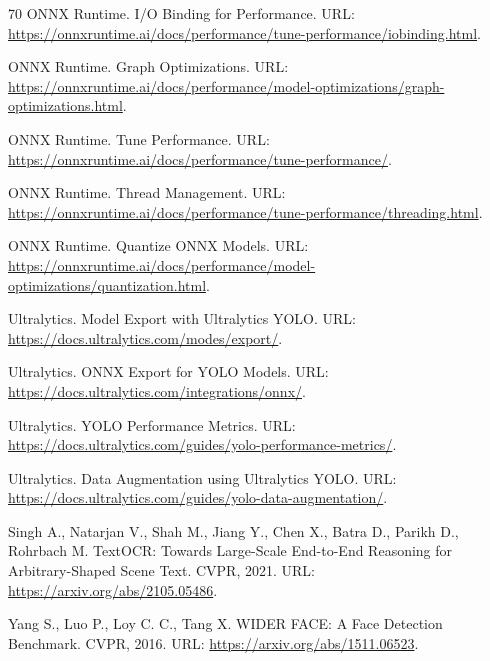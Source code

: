 \documentclass[12pt,a4paper,oneside,openany]{report}
\begin{document}
\begin{thebibliography}{70}
  ONNX Runtime. I/O Binding for Performance. URL:
  \url{https://onnxruntime.ai/docs/performance/tune-performance/iobinding.html}.

  ONNX Runtime. Graph Optimizations. URL:
  \url{https://onnxruntime.ai/docs/performance/model-optimizations/graph-optimizations.html}.

  ONNX Runtime. Tune Performance. URL:
  \url{https://onnxruntime.ai/docs/performance/tune-performance/}.

  ONNX Runtime. Thread Management. URL:
  \url{https://onnxruntime.ai/docs/performance/tune-performance/threading.html}.

  ONNX Runtime. Quantize ONNX Models. URL:
  \url{https://onnxruntime.ai/docs/performance/model-optimizations/quantization.html}.


  Ultralytics. Model Export with Ultralytics YOLO. URL:
  \url{https://docs.ultralytics.com/modes/export/}.

  Ultralytics. ONNX Export for YOLO Models. URL:
  \url{https://docs.ultralytics.com/integrations/onnx/}.

  Ultralytics. YOLO Performance Metrics. URL:
  \url{https://docs.ultralytics.com/guides/yolo-performance-metrics/}.

  Ultralytics. Data Augmentation using Ultralytics YOLO. URL:
  \url{https://docs.ultralytics.com/guides/yolo-data-augmentation/}.


  Singh A., Natarjan V., Shah M., Jiang Y., Chen X., Batra D., Parikh D., Rohrbach M. TextOCR:
  Towards Large-Scale End-to-End Reasoning for Arbitrary-Shaped Scene Text. CVPR, 2021. URL:
  \url{https://arxiv.org/abs/2105.05486}.

  Yang S., Luo P., Loy C. C., Tang X. WIDER FACE: A Face Detection Benchmark. CVPR, 2016. URL:
  \url{https://arxiv.org/abs/1511.06523}.


\end{thebibliography}
\end{document}
